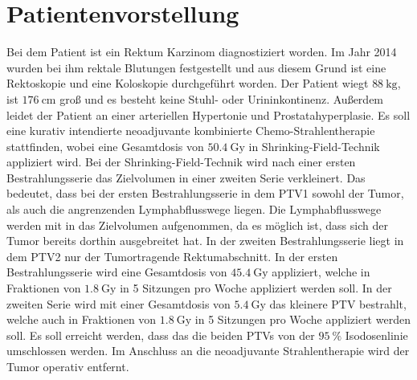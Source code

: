 \section{Patientenvorstellung}
\label{sec:Durchführung}
Bei dem Patient ist ein Rektum Karzinom diagnostiziert worden.
Im Jahr 2014 wurden bei ihm rektale Blutungen festgestellt und aus diesem Grund ist eine
Rektoskopie und eine Koloskopie durchgeführt worden.
Der Patient wiegt $\SI{88}{\kilogram}$, ist $\SI{176}{\centi\meter}$ groß und es besteht keine Stuhl- oder Urininkontinenz.
Außerdem leidet der Patient an einer arteriellen Hypertonie und Prostatahyperplasie.
Es soll eine kurativ intendierte neoadjuvante kombinierte Chemo-Strahlentherapie stattfinden,
wobei eine Gesamtdosis von $\SI{50,4}{\gray}$ in
Shrinking-Field-Technik appliziert wird.
Bei der Shrinking-Field-Technik wird nach einer ersten Bestrahlungsserie das Zielvolumen in einer zweiten Serie verkleinert.
Das bedeutet, dass bei der ersten Bestrahlungsserie in dem PTV1 sowohl der Tumor, als auch die angrenzenden Lymphabflusswege liegen.
Die Lymphabflusswege werden mit in das Zielvolumen aufgenommen, da es möglich ist, dass sich der Tumor bereits dorthin ausgebreitet hat.
In der zweiten Bestrahlungsserie liegt in dem PTV2 nur der Tumortragende Rektumabschnitt.
In der ersten Bestrahlungsserie wird eine Gesamtdosis von $\SI{45,4}{\gray}$ appliziert,
welche in Fraktionen von $\SI{1,8}{\gray}$ in 5 Sitzungen pro Woche appliziert werden soll.
In der zweiten Serie wird mit einer Gesamtdosis von $\SI{5,4}{\gray}$ das kleinere PTV bestrahlt,
welche auch in Fraktionen von $\SI{1,8}{\gray}$ in 5 Sitzungen pro Woche appliziert werden soll.
Es soll erreicht werden, dass das die beiden PTVs von der $\SI{95}{\percent}$ Isodosenlinie umschlossen werden.
Im Anschluss an die neoadjuvante Strahlentherapie wird der Tumor operativ entfernt.
